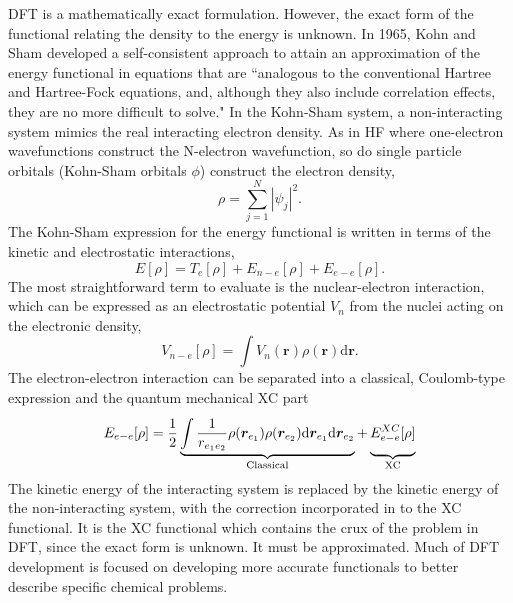 \ac{DFT} is a mathematically exact formulation. However, the exact form of the functional relating the density to the energy is unknown. In 1965, Kohn and Sham developed a self-consistent approach to attain an approximation of the energy functional in equations that are ``analogous to the conventional Hartree and Hartree-Fock equations, and, although they also include correlation effects, they are no more difficult to solve."\cite{Kohn1965} In the Kohn-Sham system, a non-interacting system mimics the real interacting electron density. As in \ac{HF} where one-electron wavefunctions construct the N-electron wavefunction, so do single particle orbitals (Kohn-Sham orbitals $\phi$) construct the electron density,
\begin{equation}
    \rho=\sum_{j=1}^{N}|\psi_{j}|^{2}.
\end{equation}
The Kohn-Sham expression for the energy functional is written in terms of the kinetic and electrostatic interactions,
\begin{equation}
    E[\rho]=T_{e}[\rho]+E_{n-e}[\rho]+E_{e-e}[\rho].
\end{equation}
The most straightforward term to evaluate is the nuclear-electron interaction, which can be expressed as an electrostatic potential $V_{n}$ from the nuclei acting on the electronic density, 
\begin{equation}
    V_{n-e}[\rho]=\int{V_{n}(\bm{r})\rho(\bm{r})\mathrm{d}\bm{r}}.
\end{equation}
The electron-electron interaction can be separated into a classical, Coulomb-type expression and the quantum mechanical \ac{XC} part
\begin{equation}
    E_{e-e}[\rho]=\frac{1}{2}\underbrace{\int{}\frac{1}{r_{e_{1}e_{2}}}\rho(\bm{r}_{e_{1}})\rho(\bm{r}_{e_{2}})\mathrm{d}\bm{r}_{e_{1}}\mathrm{d}\bm{r}_{e_{2}}}_\text{Classical}+\underbrace{\vphantom{ \left(\frac{a^{0.3}}{b}\right) }E_{e-e}^{XC}[\rho]}_\text{XC}
\end{equation}
The kinetic energy of the interacting system is replaced by the kinetic energy of the non-interacting system, with the correction incorporated in to the \ac{XC} functional. It is the \ac{XC} functional which contains the crux of the problem in \ac{DFT}, since the exact form is unknown. It must be approximated. Much of \ac{DFT} development is focused on developing more accurate functionals to better describe specific chemical problems.

